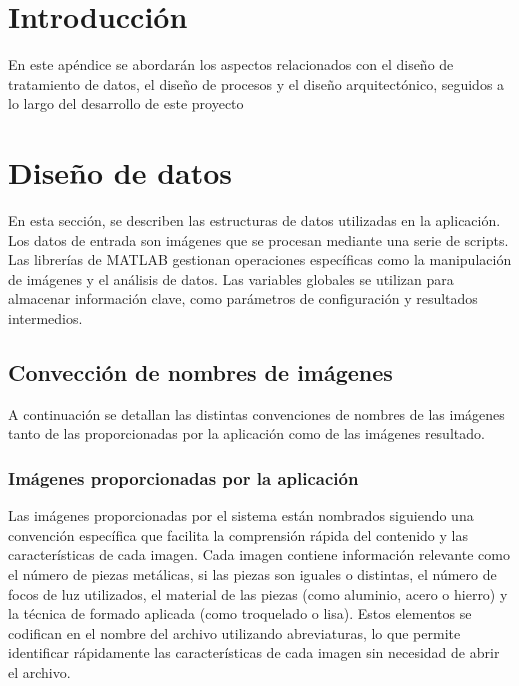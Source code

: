 
\section{Introducción}\label{introducción-diseño}

En este apéndice se abordarán los aspectos relacionados con el diseño de tratamiento de datos, el diseño de procesos y el diseño arquitectónico, seguidos a lo largo del desarrollo de este proyecto

\section{Diseño de datos}\label{diseño-de-datos}

En esta sección, se describen las estructuras de datos utilizadas en la aplicación. Los datos de entrada son imágenes que se procesan mediante una serie de scripts. Las librerías de MATLAB gestionan operaciones específicas como la manipulación de imágenes y el análisis de datos. Las variables globales se utilizan para almacenar información clave, como parámetros de configuración y resultados intermedios.

\subsection{Convección de nombres de imágenes}\label{convección-de-nombres-de-imágenes}

A continuación se detallan las distintas convenciones de nombres de las imágenes tanto de las proporcionadas por la aplicación como de las imágenes resultado.

\subsubsection{Imágenes proporcionadas por la aplicación}\label{imágenes-proporcionadas-por-la-aplicación}

Las imágenes proporcionadas por el sistema están nombrados siguiendo una convención específica que facilita la comprensión rápida del contenido y las características de cada imagen. Cada imagen contiene información relevante como el número de piezas metálicas, si las piezas son iguales o distintas, el número de focos de luz utilizados, el material de las piezas (como aluminio, acero o hierro) y la técnica de formado aplicada (como troquelado o lisa). Estos elementos se codifican en el nombre del archivo utilizando abreviaturas, lo que permite identificar rápidamente las características de cada imagen sin necesidad de abrir el archivo.

